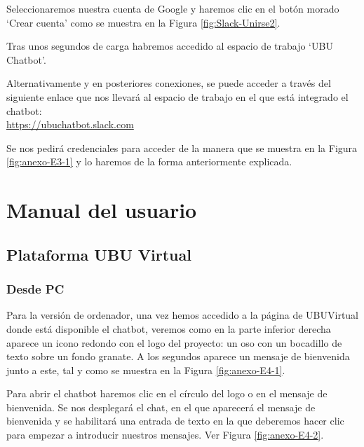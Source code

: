 
Seleccionaremos nuestra cuenta de Google y haremos clic en el botón morado `Crear cuenta' como se muestra en la Figura \ref{fig:Slack-Unirse2}.


Tras unos segundos de carga habremos accedido al espacio de trabajo `UBU Chatbot'.

Alternativamente y en posteriores conexiones, se puede acceder a través del siguiente enlace que nos llevará al espacio de trabajo en el que está integrado el chatbot:\\
\url{https://ubuchatbot.slack.com}

Se nos pedirá credenciales para acceder de la manera que se muestra en la Figura \ref{fig:anexo-E3-1} y lo haremos de la  forma anteriormente explicada.

\newpage

\section{Manual del usuario}

\subsection{Plataforma UBU Virtual}

\subsubsection{Desde PC} \label{subsection:marca-manualpc}

Para la versión de ordenador, una vez hemos accedido a la página de UBUVirtual donde está disponible el chatbot, veremos como en la parte inferior derecha aparece un icono redondo con el logo del proyecto: un oso con un bocadillo de texto sobre un fondo granate. A los segundos aparece un mensaje de bienvenida junto a este, tal y como se muestra en la Figura \ref{fig:anexo-E4-1}.


Para abrir el chatbot haremos clic en el círculo del logo o en el mensaje de bienvenida. Se nos desplegará el chat, en el que aparecerá el mensaje de bienvenida y se habilitará una entrada de texto en la que deberemos hacer clic para empezar a introducir nuestros mensajes. Ver Figura \ref{fig:anexo-E4-2}.


